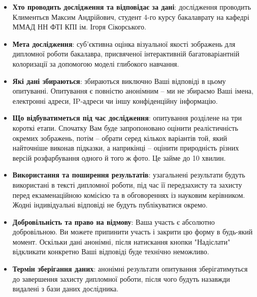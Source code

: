 
\label{appendix:B}
    \begin{itemize}[label=$\bullet$]
        \item \textbf{Хто проводить дослідження та відповідає за дані}:
            дослідження проводить Климентьєв Максим Андрійович, студент 4-го курсу бакалаврату на кафедрі ММАД НН ФТІ КПІ ім. Ігоря Сікорського.
        \item \textbf{Мета дослідження}:
            суб'єктивна оцінка візуальної якості зображень для дипломної роботи бакалавра, присвяченої інтерактивній багатоваріантній колоризації за допомогою моделі глибокого навчання.
        \item \textbf{Які дані збираються}:
            збираються виключно Ваші відповіді в цьому опитуванні.
            Опитування є повністю анонімним -- ми не збираємо Ваші імена, електронні адреси, IP-адреси чи іншу конфіденційну інформацію.
        \item \textbf{Що відбуватиметься під час дослідження}:
            опитування розділене на три короткі етапи.
            Спочатку Вам буде запропоновано оцінити реалістичність окремих зображень, потім -- обрати серед кількох варіантів той, який найточніше виконав підказки, а наприкінці -- оцінити природність різних версій розфарбування одного й того ж фото.
            Це займе до 10 хвилин.
        \item \textbf{Використання та поширення результатів}:
            узагальнені результати будуть використані в тексті дипломної роботи, під час її передзахисту та захисту перед екзаменаційною комісією та в обговореннях із науковим керівником.
            Жодні індивідуальні відповіді не будуть публікуватися окремо.
        \item \textbf{Добровільність та право на відмову}:
            Ваша участь є абсолютно добровільною.
            Ви можете припинити участь і закрити цю форму в будь-який момент.
            Оскільки дані анонімні, після натискання кнопки "Надіслати" відкликати конкретно Ваші відповіді буде технічно неможливо.
        \item \textbf{Термін зберігання даних}:
            анонімні результати опитування зберігатимуться до завершення захисту дипломної роботи, після чого будуть назавжди видалені з бази даних дослідника.

\end{itemize}
